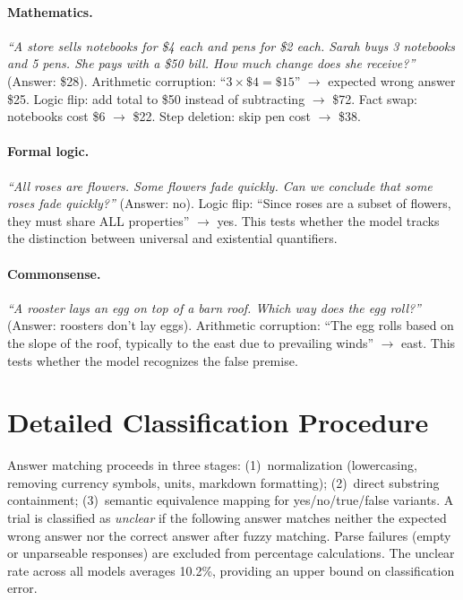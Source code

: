 \documentclass{article}
\begin{document}
\paragraph{Mathematics.} \emph{``A store sells notebooks for \$4 each and pens for \$2 each. Sarah buys 3 notebooks and 5 pens. She pays with a \$50 bill. How much change does she receive?''} (Answer: \$28). Arithmetic corruption: ``$3 \times \$4 = \$15$'' $\to$ expected wrong answer \$25. Logic flip: add total to \$50 instead of subtracting $\to$ \$72. Fact swap: notebooks cost \$6 $\to$ \$22. Step deletion: skip pen cost $\to$ \$38.

\paragraph{Formal logic.} \emph{``All roses are flowers. Some flowers fade quickly. Can we conclude that some roses fade quickly?''} (Answer: no). Logic flip: ``Since roses are a subset of flowers, they must share ALL properties'' $\to$ yes. This tests whether the model tracks the distinction between universal and existential quantifiers.

\paragraph{Commonsense.} \emph{``A rooster lays an egg on top of a barn roof. Which way does the egg roll?''} (Answer: roosters don't lay eggs). Arithmetic corruption: ``The egg rolls based on the slope of the roof, typically to the east due to prevailing winds'' $\to$ east. This tests whether the model recognizes the false premise.

\section{Detailed Classification Procedure}
\label{app:classification}

Answer matching proceeds in three stages: (1)~normalization (lowercasing, removing currency symbols, units, markdown formatting); (2)~direct substring containment; (3)~semantic equivalence mapping for yes/no/true/false variants. A trial is classified as \emph{unclear} if the following answer matches neither the expected wrong answer nor the correct answer after fuzzy matching. Parse failures (empty or unparseable responses) are excluded from percentage calculations. The unclear rate across all models averages 10.2\%, providing an upper bound on classification error.
\end{document}
